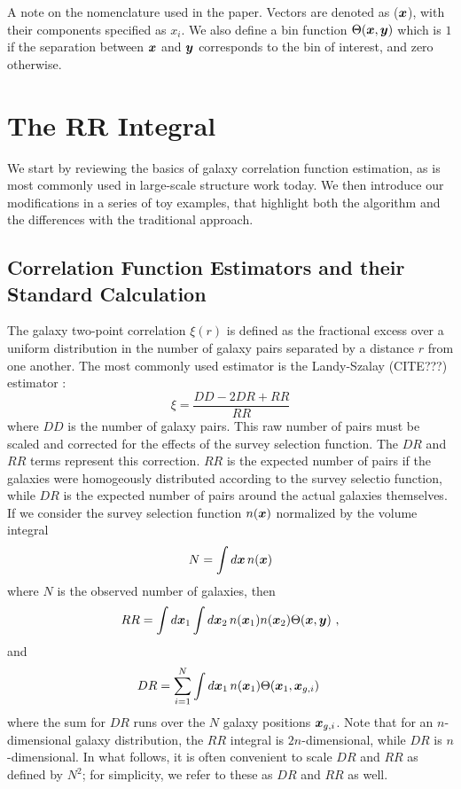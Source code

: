 \documentclass[usenatbib]{mn2e}
\begin{document}
A note on the nomenclature used in the paper. Vectors are denoted as (${\bm x}$),
with their components specified as $x_{i}$. We also define a bin function
$\Theta({\bm x},{\bm y})$ which is $1$ if the separation between ${\bm x}$ and ${\bm y}$
corresponds to the bin of interest, and zero otherwise. 

\section{The RR Integral}
\label{sec:RR}

We start by reviewing the basics of galaxy correlation function estimation, as 
is most commonly used in large-scale structure work today. We then introduce 
our modifications in a series of toy examples, that highlight both the algorithm
and the differences with the traditional approach.

\subsection{Correlation Function Estimators and their Standard Calculation}

The galaxy two-point correlation $\xi(r)$ is defined as the fractional excess
over a uniform distribution in the number of galaxy pairs separated by a
distance $r$ from one another. The most commonly used estimator is the
Landy-Szalay (CITE???) estimator :
\begin{equation}
\xi = \frac{DD - 2 DR + RR}{RR}
\end{equation}
where $DD$ is the number of galaxy pairs. This raw number of pairs must be
scaled and corrected for the effects of the survey selection function. The $DR$
and $RR$ terms represent this correction. $RR$ is the expected number of pairs
if the galaxies were homogeously distributed according to the survey selectio
function, while $DR$ is the expected number of pairs around the actual galaxies
themselves. If we consider the survey selection function $n({\bm x})$ normalized
by the volume integral
\begin{equation}
N = \int d{\bm x}\,n({\bm x})
\end{equation}
where $N$ is the observed number of galaxies, then 
\begin{equation}
RR = \int d{\bm x}_1  \int d{\bm x}_2 \,n({\bm x}_1) n({\bm x}_2) \Theta({\bm x},{\bm y}) \,\,,
\label{eq:RRdef}
\end{equation}
and 
\begin{equation}
DR = \sum_{i=1}^{N} \int d{\bm x}_1 \,n({\bm x}_1) \Theta({\bm x}_1, {\bm x}_{g,i}) \,\,
\label{eq:DRdef}
\end{equation}
where the sum for $DR$ runs over the $N$ galaxy positions ${\bm x}_{g,i}$. 
Note that for an $n$-dimensional galaxy distribution, the $RR$ integral is
$2n$-dimensional, while $DR$ is $n$-dimensional. In what follows, it is often
convenient to scale $DR$ and $RR$ as defined by $N^2$; for simplicity, we refer
to these as $DR$ and $RR$ as well.
\end{document}
